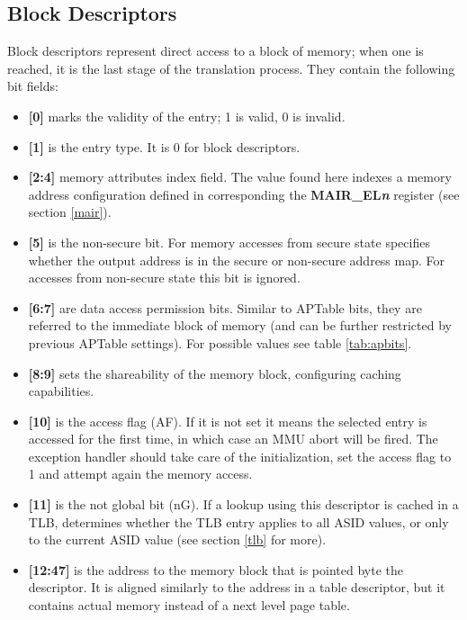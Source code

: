 \documentclass[12pt,a4paper,openright,twoside]{report}
\begin{document}
\subsection{Block Descriptors}
\label{mmublock}
Block descriptors represent direct access to a block of memory; when one is reached,
it is the last stage of the translation process. They contain the following bit
fields:
\begin{itemize}
    \item \textbf{[0]} marks the validity of the entry; 1 is valid, 0 is invalid.
    \item \textbf{[1]} is the entry type. It is 0 for block descriptors.
    \item \textbf{[2:4]} memory attributes index field. The value found here
        indexes a memory address configuration defined in corresponding 
        the \textbf{MAIR\_EL\textit{n}} register (see section \ref{mair}).
    \item \textbf{[5]} is the non-secure bit. For memory accesses from 
        secure state specifies whether the output address is in
        the secure or non-secure address map. For accesses from non-secure state
        this bit is ignored.
    \item \textbf{[6:7]} are data access permission bits. Similar to APTable bits,
        they are referred to the immediate block of memory (and can be further
        restricted by previous APTable settings). For possible values see table
        \ref{tab:apbits}.
    \item \textbf{[8:9]} sets the shareability of the memory block, configuring
        caching capabilities.
    \item \textbf{[10]} is the access flag (AF). If it is not set it means the 
        selected entry is accessed for the first time, in which case an MMU abort
        will be fired. The exception handler should take care of the initialization,
        set the access flag to 1 and attempt again the memory access.
    \item \textbf{[11]} is the not global bit (nG). If a lookup using this 
        descriptor is cached in a TLB, determines whether the TLB
        entry applies to all ASID values, or only to the current ASID value
        (see section \ref{tlb} for more).
    \item \textbf{[12:47]} is the address to the memory block that is pointed byte
        the descriptor. It is aligned similarly to the address in a table descriptor,
        but it contains actual memory instead of a next level page table.

\end{itemize}
\end{document}

